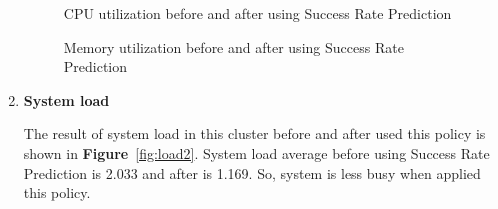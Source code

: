 \documentclass[12pt,oneside,openright,a4paper]{cpe-english-project}
\begin{document}
\begin{enumerate}
\begin{figure}[!h]\centering
    \setlength{\fboxrule}{0mm} %
    \setlength{\fboxsep}{0cm}
    \caption{CPU utilization before and after using Success Rate Prediction}\label{fig:cpu2}
\end{figure}

\begin{figure}[!h]\centering
    \setlength{\fboxrule}{0mm} %
    \setlength{\fboxsep}{0cm}
    \caption{Memory utilization before and after using Success Rate Prediction}\label{fig:mem2}
\end{figure}

\newpage
  \item \textbf{System load}
  
\hspace{10mm}The result of system load in this cluster before and after used this policy is shown in \textbf{Figure}~\ref{fig:load2}. System load average before using Success Rate Prediction is 2.033 and after is 1.169. So, system is less busy when applied this policy.
  

\end{enumerate}
\end{document}
